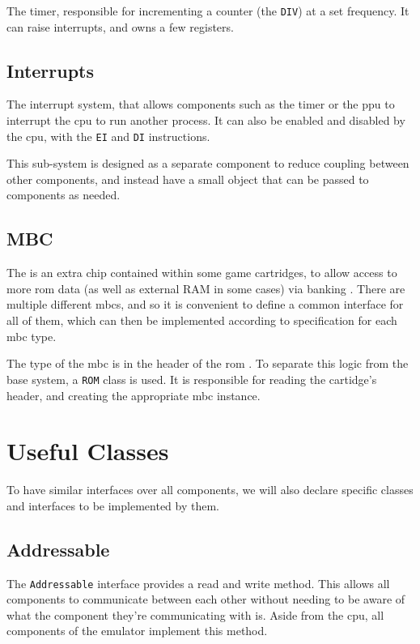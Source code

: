 \documentclass[11pt]{report}
\begin{document}
The timer, responsible for incrementing a counter (the \texttt{DIV}) at a set frequency. It can raise interrupts, and owns a few registers.

\subsection{Interrupts}

The interrupt system, that allows components such as the timer or the \gls{ppu} to interrupt the \gls{cpu} to run another process. It can also be enabled and disabled by the \gls{cpu}, with the \texttt{EI} and \texttt{DI} instructions.

This sub-system is designed as a separate component to reduce coupling between other components, and instead have a small object that can be passed to components as needed.

\subsection{MBC}

The  is an extra chip contained within some game cartridges, to allow access to more \gls{rom} data (as well as external RAM in some cases) via banking \cite[MBCs]{pandoc}. There are multiple different \glspl{mbc}, and so it is convenient to define a common interface for all of them, which can then be implemented according to specification for each \gls{mbc} type.

The type of the \gls{mbc} is in the header of the \gls{rom} \cite[The Cartridge Header]{pandoc}. To separate this logic from the base system, a \texttt{ROM} class is used. It is responsible for reading the cartidge's header, and creating the appropriate \gls{mbc} instance.

\section{Useful Classes}

To have similar interfaces over all components, we will also declare specific classes and interfaces to be implemented by them.

\subsection{Addressable}

The \texttt{Addressable} interface provides a read and write method. This allows all components to communicate between each other without needing to be aware of what the component they're communicating with is. Aside from the \gls{cpu}, all components of the emulator implement this method.
\end{document}
